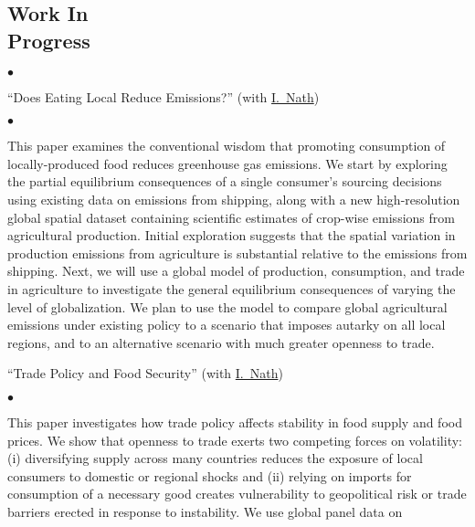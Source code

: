 \documentclass[margin,line]{res}
\newenvironment{list0}{
  \begin{list}{$\bullet$}{%
      \setlength{\itemsep}{0in}
      \setlength{\parsep}{0in} \setlength{\parskip}{0in}
      \setlength{\topsep}{0in} \setlength{\partopsep}{0in}
      \setlength{\leftmargin}{0.0in}}}{\end{list}}
\newenvironment{list1}{
  \begin{list}{$\bullet$}{%
      \setlength{\itemsep}{0in}
      \setlength{\parsep}{0in} \setlength{\parskip}{0in}
      \setlength{\topsep}{0in} \setlength{\partopsep}{0in}
      \setlength{\leftmargin}{0.17in}}}{\end{list}}
\begin{document}
\begin{resume}
\section{\sc Work In \\ Progress}
\begin{list0}
    \item[] ``Does Eating Local Reduce Emissions?''
    (with \href{https://www.ishannath.com/}{I.~Nath})
    \vspace*{2mm}
    \begin{list1}
        \item[] This paper examines the conventional wisdom that promoting
        consumption of locally-produced food reduces greenhouse gas emissions.
        We start by exploring the partial equilibrium consequences of a single
        consumer's sourcing decisions using existing data on emissions from
        shipping, along with a new high-resolution global spatial dataset
        containing scientific estimates of crop-wise emissions from agricultural
        production. Initial exploration suggests that the spatial variation in
        production emissions from agriculture is substantial relative to the
        emissions from shipping. Next, we will use a global model of production,
        consumption, and trade in agriculture to investigate the general
        equilibrium consequences of varying the level of globalization. We plan
        to use the model to compare global agricultural emissions under existing
        policy to a scenario that imposes autarky on all local regions, and to
        an alternative scenario with much greater openness to trade.
    \end{list1}
    \vspace*{2mm}
    \item[] ``Trade Policy and Food Security''
    (with \href{https://www.ishannath.com/}{I.~Nath})
    \vspace*{2mm}
    \begin{list1}
        \item[] This paper investigates how trade policy affects stability in
        food supply and food prices. We show that openness to trade exerts two
        competing forces on volatility: (i) diversifying supply across many
        countries reduces the exposure of local consumers to domestic or
        regional shocks and (ii) relying on imports for consumption of a
        necessary good creates vulnerability to geopolitical risk or trade
        barriers erected in response to instability. We use global panel data on

\end{list1}
\end{list0}
\end{resume}
\end{document}
